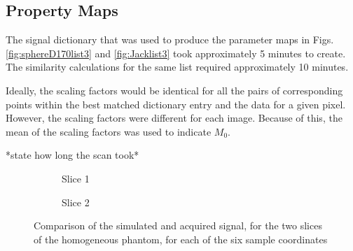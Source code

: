 \documentclass[journal]{IEEEtran}
\newlength\figureheight
\newlength\figurewidth
\begin{document}
\subsection{Property Maps}
The signal dictionary that was used to produce the parameter maps in Figs. \ref{fig:sphereD170list3} and \ref{fig:Jacklist3} took approximately 5 minutes to create. The similarity calculations for the same list required approximately 10 minutes.
 
 Ideally, the scaling factors would be identical for all the pairs of corresponding points within the best matched dictionary entry and the data for a given pixel. However, the scaling factors were different for each image. Because of this, the mean of the scaling factors was used to indicate $M_0$. 


*state how long the scan took*
\begin{figure*}
\centering
\begin{minipage}[b]{1\textwidth}

\begin{subfigure}[b]{1\textwidth}
\setlength{}
\setlength{}



\caption{Slice 1}
    \label{fig:sphereD170simCom3slice1}
 
\end{subfigure}
\begin{subfigure}[b]{1\textwidth}

\setlength{}
\setlength{}


\caption{Slice 2}
    \label{fig:sphereD170simCom3slice2}
 

\end{subfigure}
\caption{Comparison of the simulated and acquired signal, for the two slices of the homogeneous phantom, for each of the six sample coordinates}
\end{minipage}
\end{figure*}
\end{document}
